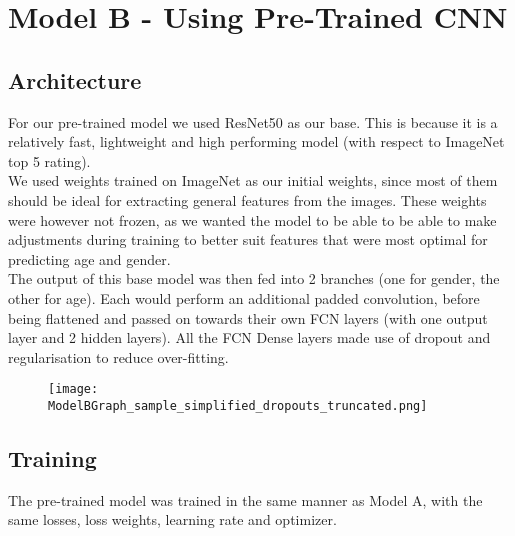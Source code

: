 
\section{Model B - Using Pre-Trained CNN}
\subsection{Architecture}
For our pre-trained model we used ResNet50 as our base. This is because it is a relatively fast, lightweight and high performing model (with respect to ImageNet top 5 rating).\\
We used weights trained on ImageNet as our initial weights, since most of them should be ideal for extracting general features from the images.
These weights were however not frozen, as we wanted the model to be able to be able to make adjustments during training to better suit features that were most optimal for predicting age and gender.\\
The output of this base model was then fed into 2 branches (one for gender, the other for age).
Each would perform an additional padded convolution, before being flattened and passed on towards their own FCN layers (with one output layer and 2 hidden layers).
All the FCN Dense layers made use of dropout and regularisation to reduce over-fitting.
\begin{figure}[h]
    \centering
    \texttt{[image: ModelBGraph\_sample\_simplified\_dropouts\_truncated.png]}
\end{figure}

\subsection{Training}
The pre-trained model was trained in the same manner as Model A, with the same losses, loss weights, learning rate and optimizer. 

